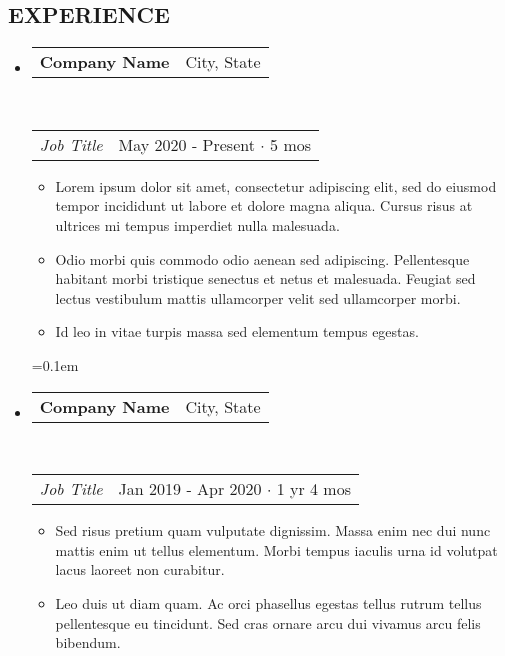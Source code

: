 \documentclass[10pt,letterpaper]{article}
\makeatletter
\newcommand{\headerrow}[2]
{\begin{tabular*}{\linewidth}{l@{\extracolsep{\fill}}r}
	#1 &
	#2 \\
\end{tabular*}}
\makeatother
\begin{document}
\subsection*{EXPERIENCE}
\vspace{-0.2em}
\begin{itemize}[leftmargin=0cm]
\setlength{\itemsep}{1pt}
  \setlength{\parskip}{0pt}
  \setlength{\parsep}{0pt}
	\parskip=0.1em
	\item[]
	\headerrow
		{\textbf{Company Name}}
		{{City, State}}
	\\
	\headerrow
		{\emph{Job Title}}
		{{May 2020 - Present $\cdot$ 5 mos}}
	\begin{itemize}[leftmargin=.43cm]
	\setlength{\itemsep}{1pt}
  \setlength{\parskip}{0pt}
  \setlength{\parsep}{0pt}

		\item  Lorem ipsum dolor sit amet, consectetur adipiscing elit, sed do eiusmod tempor incididunt ut labore et dolore magna aliqua. Cursus risus at ultrices mi tempus imperdiet nulla malesuada.
		
		\item Odio morbi quis commodo odio aenean sed adipiscing. Pellentesque habitant morbi tristique senectus et netus et malesuada. Feugiat sed lectus vestibulum mattis ullamcorper velit sed ullamcorper morbi. 
		
		\item Id leo in vitae turpis massa sed elementum tempus egestas.
		
	\end{itemize}
	
\setlength{\itemsep}{1pt}
  \setlength{\parskip}{0pt}
  \setlength{\parsep}{0pt}
	\parskip=0.1em
	\item[]
	\headerrow
		{\textbf{Company Name}}
		{{City, State}}
	\\
	\headerrow
		{\emph{Job Title}}
		{{Jan 2019 - Apr 2020 $\cdot$ 1 yr 4 mos}}
	\begin{itemize}[leftmargin=.43cm]
	\setlength{\itemsep}{1pt}
  \setlength{\parskip}{0pt}
  \setlength{\parsep}{0pt}


		
		

		
		\item  Sed risus pretium quam vulputate dignissim. Massa enim nec dui nunc mattis enim ut tellus elementum. Morbi tempus iaculis urna id volutpat lacus laoreet non curabitur. 
		
		\item Leo duis ut diam quam. Ac orci phasellus egestas tellus rutrum tellus pellentesque eu tincidunt. Sed cras ornare arcu dui vivamus arcu felis bibendum.


\end{itemize}
\end{itemize}
\end{document}
